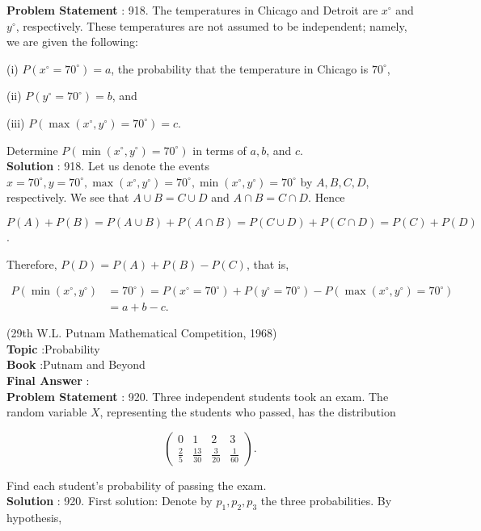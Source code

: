 \documentclass[10pt]{article}
\begin{document}
\textbf{Problem Statement} :
918. The temperatures in Chicago and Detroit are $x^{\circ}$ and $y^{\circ}$, respectively. These temperatures are not assumed to be independent; namely, we are given the following:

(i) $P\left(x^{\circ}=70^{\circ}\right)=a$, the probability that the temperature in Chicago is $70^{\circ}$,

(ii) $P\left(y^{\circ}=70^{\circ}\right)=b$, and

(iii) $P\left(\max \left(x^{\circ}, y^{\circ}\right)=70^{\circ}\right)=c$.

Determine $P\left(\min \left(x^{\circ}, y^{\circ}\right)=70^{\circ}\right)$ in terms of $a, b$, and $c$.
\\
\textbf{Solution} :
918. Let us denote the events $x=70^{\circ}, y=70^{\circ}, \max \left(x^{\circ}, y^{\circ}\right)=70^{\circ}, \min \left(x^{\circ}, y^{\circ}\right)=70^{\circ}$ by $A, B, C, D$, respectively. We see that $A \cup B=C \cup D$ and $A \cap B=C \cap D$. Hence

$P(A)+P(B)=P(A \cup B)+P(A \cap B)=P(C \cup D)+P(C \cap D)=P(C)+P(D)$.

Therefore, $P(D)=P(A)+P(B)-P(C)$, that is, 

$$
\begin{aligned}
P\left(\min \left(x^{\circ}, y^{\circ}\right)\right.&\left.=70^{\circ}\right)=P\left(x^{\circ}=70^{\circ}\right)+P\left(y^{\circ}=70^{\circ}\right)-P\left(\max \left(x^{\circ}, y^{\circ}\right)=70^{\circ}\right) \\
&=a+b-c .
\end{aligned}
$$

(29th W.L. Putnam Mathematical Competition, 1968)
\\
\textbf{Topic} :Probability\\
\textbf{Book} :Putnam and Beyond\\
\textbf{Final Answer} :\\


\textbf{Problem Statement} :
920. Three independent students took an exam. The random variable $X$, representing the students who passed, has the distribution

$$
\left(\begin{array}{cccc}
0 & 1 & 2 & 3 \\
\frac{2}{5} & \frac{13}{30} & \frac{3}{20} & \frac{1}{60}
\end{array}\right) .
$$

Find each student's probability of passing the exam.
\\
\textbf{Solution} :
920. First solution: Denote by $p_{1}, p_{2}, p_{3}$ the three probabilities. By hypothesis,
\end{document}
